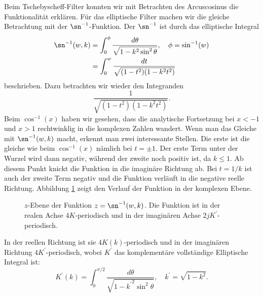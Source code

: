 Beim Tschebyscheff-Filter konnten wir mit Betrachten des Arcuscosinus die Funktionalität erklären.
Für das elliptische Filter machen wir die gleiche Betrachtung mit der $\sn^{-1}$-Funktion.
Der $\sn^{-1}$ ist durch das elliptische Integral
\begin{align}
    \sn^{-1}(w, k)
        & =
    \int_{0}^{\phi}
    \frac{
        d\theta
    }{
        \sqrt{
            1-k^2 \sin^2 \theta
        }
    },
    \quad
    \phi = \sin^{-1}(w)
    \\
        & =
    \int_{0}^{w}
    \frac{
        dt
    }{
        \sqrt{
            (1-t^2)(1-k^2 t^2)
        }
    }
\end{align}
beschrieben.
Dazu betrachten wir wieder den Integranden
\begin{equation}
    \frac{
        1
    }{
        \sqrt{
            (1-t^2)(1-k^2 t^2)
        }
    }.
\end{equation}
Beim $\cos^{-1}(x)$ haben wir gesehen, dass die analytische Fortsetzung bei $x < -1$ und $x > 1$ rechtwinklig in die komplexen Zahlen wandert.
Wenn man das Gleiche mit $\sn^{-1}(w, k)$ macht, erkennt man zwei interessante Stellen.
Die erste ist die gleiche wie beim $\cos^{-1}(x)$ nämlich bei $t = \pm 1$.
Der erste Term unter der Wurzel wird dann negativ, während der zweite noch positiv ist, da $k \leq 1$.
Ab diesem Punkt knickt die Funktion in die imaginäre Richtung ab.
Bei $t = 1/k$ ist auch der zweite Term negativ und die Funktion verläuft in die negative reelle Richtung.
Abbildung \ref{ellfilter:fig:sn} zeigt den Verlauf der Funktion in der komplexen Ebene.
\begin{figure}
    \centering
    
    \caption{
        $z$-Ebene der Funktion $z = \sn^{-1}(w, k)$.
        Die Funktion ist in der realen Achse $4K$-periodisch und in der imaginären Achse $2jK^\prime$-periodisch.
    }
    \label{ellfilter:fig:sn}
\end{figure}
In der reellen Richtung ist sie $4K(k)$-periodisch und in der imaginären Richtung $4K^\prime$-periodisch, wobei $K^\prime$ das komplementäre vollständige Elliptische Integral ist:
\begin{equation}
    K^\prime(k)
    =
    \int_{0}^{\pi / 2}
    \frac{
        d\theta
    }{
        \sqrt{
            1-{k^\prime}^2 \sin^2 \theta
        }
    },
    \quad
    k^\prime = \sqrt{1-k^2}.
\end{equation}
